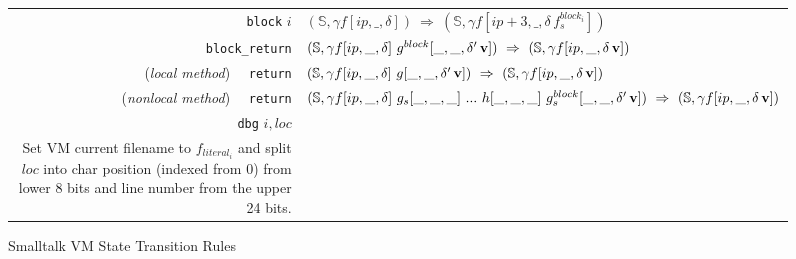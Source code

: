 \documentclass[11pt]{article}
\begin{document}
\begin{figure}
\begin{center}
\begin{tabular}[t]{|r|l|}
{\tt block} $i$  & $(\mathbb{S},\gamma f[ip,\_,\delta]) ~\Rightarrow~ (\mathbb{S},\gamma f[ip+3,\_,\delta \,f^{block_i}_s])$\\

{\tt block\_return} &  $(\mathbb{S},\gamma f[ip,\_,\delta]~g^{block}[\_,\_,\delta' \,{\bf v}]) ~\Rightarrow~ (\mathbb{S},\gamma f[ip,\_,\delta \,{\bf v}])$\\

({\em local method}) ~~{\tt return} & $(\mathbb{S},\gamma f[ip,\_,\delta] ~g[\_,\_,\delta' \,{\bf v}]) ~\Rightarrow~ (\mathbb{S},\gamma f[ip,\_,\delta \,{\bf v}])$\\

({\em nonlocal method}) ~~{\tt return} & $(\mathbb{S},\gamma f[ip,\_,\delta] ~g_s[\_,\_,\_]~ ... ~h[\_,\_,\_] ~ g^{block}_s[\_,\_,\delta' \,{\bf v}]) ~\Rightarrow~ (\mathbb{S},\gamma f[ip,\_,\delta \,{\bf v}])$\\

\hline

{\tt dbg} $i, loc$ &
\begin{minipage}[t]{.76\linewidth}
$(\mathbb{S},\gamma f[ip,\_,\_])\Rightarrow
 (\mathbb{S}[\text{\it file}\text{=}f_{literal_i}, \text{\it line}\text{=}loc[31\text{:}8], \text{\it col}\text{=}loc[7\text{:}0]],\gamma f[ip+7,\_,\_])$ \\
Set VM current filename to $f_{literal_i}$ and split $loc$ into char position (indexed from 0) from lower 8 bits and line number  from the upper 24 bits.
\end{minipage}\\
\hline
\end{tabular}
\end{center}
\vspace{-10pt}
\caption{Smalltalk VM State Transition Rules}
\label{default}
\end{figure}%

\end{document}
